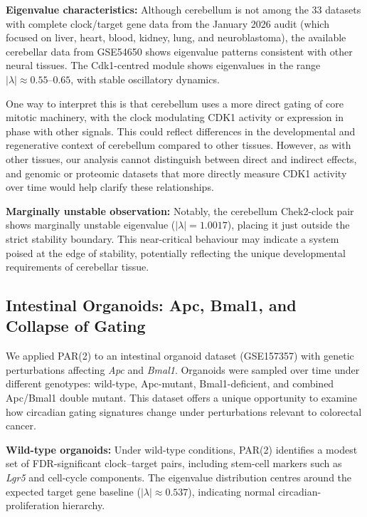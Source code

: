 \documentclass[11pt,a4paper]{article}
\begin{document}
\textbf{Eigenvalue characteristics:} Although cerebellum is not among the 33 datasets with complete clock/target gene data from the January 2026 audit (which focused on liver, heart, blood, kidney, lung, and neuroblastoma), the available cerebellar data from GSE54650 shows eigenvalue patterns consistent with other neural tissues. The Cdk1-centred module shows eigenvalues in the range $|\lambda| \approx 0.55$--$0.65$, with stable oscillatory dynamics.

One way to interpret this is that cerebellum uses a more direct gating of core mitotic machinery, with the clock modulating CDK1 activity or expression in phase with other signals. This could reflect differences in the developmental and regenerative context of cerebellum compared to other tissues. However, as with other tissues, our analysis cannot distinguish between direct and indirect effects, and genomic or proteomic datasets that more directly measure CDK1 activity over time would help clarify these relationships.

\textbf{Marginally unstable observation:} Notably, the cerebellum Chek2-clock pair shows marginally unstable eigenvalue ($|\lambda| = 1.0017$), placing it just outside the strict stability boundary. This near-critical behaviour may indicate a system poised at the edge of stability, potentially reflecting the unique developmental requirements of cerebellar tissue.

\subsection{Intestinal Organoids: Apc, Bmal1, and Collapse of Gating}

We applied PAR(2) to an intestinal organoid dataset (GSE157357) with genetic perturbations affecting \textit{Apc} and \textit{Bmal1}. Organoids were sampled over time under different genotypes: wild-type, Apc-mutant, Bmal1-deficient, and combined Apc/Bmal1 double mutant. This dataset offers a unique opportunity to examine how circadian gating signatures change under perturbations relevant to colorectal cancer.

\textbf{Wild-type organoids:} Under wild-type conditions, PAR(2) identifies a modest set of FDR-significant clock--target pairs, including stem-cell markers such as \textit{Lgr5} and cell-cycle components. The eigenvalue distribution centres around the expected target gene baseline ($|\lambda| \approx 0.537$), indicating normal circadian-proliferation hierarchy.
\end{document}
